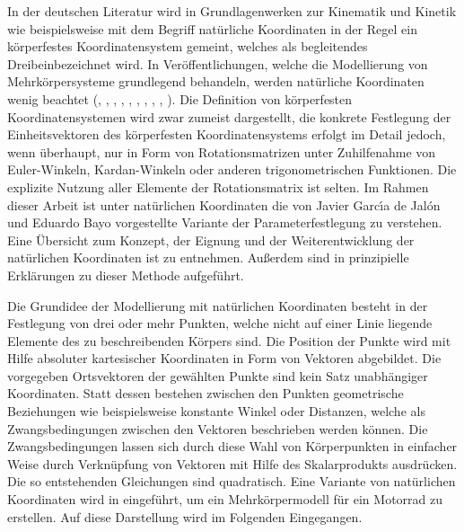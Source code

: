 In der deutschen Literatur wird in Grundlagenwerken zur Kinematik und Kinetik wie beispielsweise \cite[S. 6]{Mathiak2015} mit dem Begriff \glqq nat\"urliche Koordinaten\grqq { } in der Regel ein k\"orperfestes Koordinatensystem gemeint, welches als \glqq begleitendes Dreibein\grqq { }bezeichnet wird. In Ver\"offentlichungen, welche die Modellierung von Mehrk\"orpersysteme grundlegend behandeln, werden nat\"urliche Koordinaten wenig beachtet (\cite{Bestle2012}, \cite{GeorgRill2014}, \cite{Schramm2010}, \cite{Gattringer2011}, \cite{Schiehlen2014}, \cite{Pfeiffer2014}, \cite{ManfredHusty2012}, \cite{Wloka1992}, \cite{Woernle2011}, \cite{Gross2006}). Die Definition von k\"orperfesten Koordinatensystemen wird zwar zumeist dargestellt, die konkrete Festlegung der Einheitsvektoren des k\"orperfesten Koordinatensystems erfolgt im Detail jedoch, wenn \"uberhaupt, nur in Form von Rotationsmatrizen unter Zuhilfenahme von Euler-Winkeln, Kardan-Winkeln oder anderen trigonometrischen Funktionen. Die explizite Nutzung aller Elemente der Rotationsmatrix ist selten. \hfill \newline
Im Rahmen dieser Arbeit ist unter nat\"urlichen Koordinaten die von Javier Garc{\'{\i}}a de Jal{\'{o}}n und Eduardo Bayo \cite{Jalon1994} vorgestellte Variante der Parameterfestlegung zu verstehen. Eine \"Ubersicht zum Konzept, der Eignung und der Weiterentwicklung der nat\"urlichen Koordinaten ist \cite{Jalon2007a} zu entnehmen. Au\ss{}erdem sind in \cite{Jalon2007} prinzipielle Erkl\"arungen zu dieser Methode aufgef\"uhrt.  \hfill \newline

Die Grundidee der Modellierung mit nat\"urlichen Koordinaten besteht in der Festlegung von drei oder mehr Punkten, welche nicht auf einer Linie liegende Elemente des zu beschreibenden K\"orpers sind. Die Position der Punkte wird mit Hilfe absoluter kartesischer Koordinaten in Form von Vektoren abgebildet. Die vorgegeben Ortsvektoren der gew\"ahlten Punkte sind kein Satz unabh\"angiger Koordinaten. Statt dessen bestehen zwischen den Punkten geometrische Beziehungen wie beispielsweise konstante Winkel oder Distanzen, welche als Zwangsbedingungen zwischen den Vektoren beschrieben werden k\"onnen. Die Zwangsbedingungen lassen sich durch diese Wahl von K\"orperpunkten in einfacher Weise durch Verkn\"upfung von Vektoren mit Hilfe des Skalarprodukts ausdr\"ucken. Die so entstehenden Gleichungen sind quadratisch. Eine Variante von nat\"urlichen Koordinaten wird in \cite{Cossalter2002} eingef\"uhrt, um ein Mehrk\"orpermodell f\"ur ein Motorrad zu erstellen. Auf diese Darstellung wird im Folgenden Eingegangen. \hfill \newline

